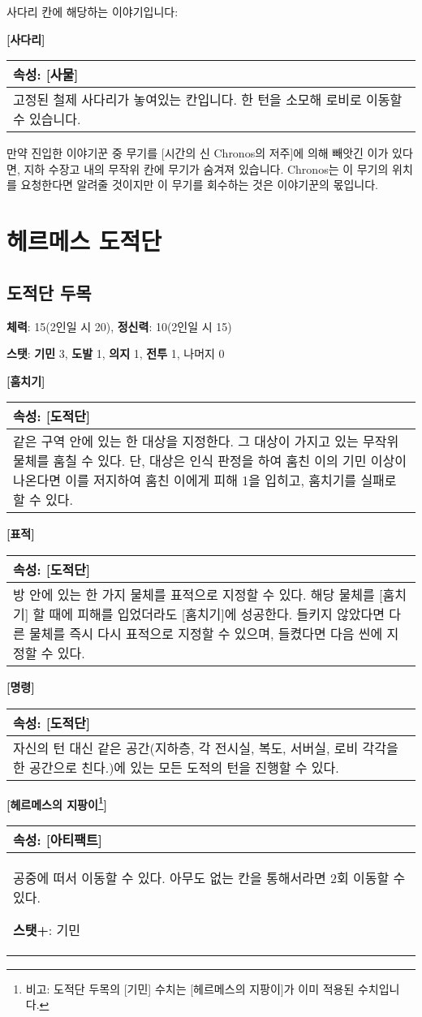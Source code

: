\documentclass[12pt]{report}
\newenvironment{story}[2]
{\begin{center}
		{\large \textbf{[#1]}}\\[1ex]
		\begin{tabular}{|p{\textwidth}|}
			\hline
			\textbf{속성}: #2
			\\
			\hline
		}
		{
			\\\hline
		\end{tabular}
	\end{center}
}
\begin{document}
	\bigskip
	
	사다리 칸에 해당하는 이야기입니다:
	\begin{story}{사다리}{[사물]}
		고정된 철제 사다리가 놓여있는 칸입니다. 한 턴을 소모해 로비로 이동할 수 있습니다.
	\end{story}
	
	만약 진입한 이야기꾼 중 무기를 [시간의 신 Chronos의 저주]에 의해 빼앗긴 이가 있다면, 지하 수장고 내의 무작위 칸에 무기가 숨겨져 있습니다. Chronos는 이 무기의 위치를 요청한다면 알려줄 것이지만 이 무기를 회수하는 것은 이야기꾼의 몫입니다.
	
	\chapter{헤르메스 도적단}
		\section*{도적단 두목}
		\textbf{체력}: 15(2인일 시 20), \textbf{정신력}: 10(2인일 시 15)
		
		\textbf{스탯}: \textbf{기민} 3, \textbf{도발} 1, \textbf{의지} 1, \textbf{전투} 1, 나머지 0
		
		\begin{story}{훔치기}{[도적단]}
			같은 구역 안에 있는 한 대상을 지정한다. 그 대상이 가지고 있는 무작위 물체를 훔칠 수 있다. 단, 대상은 인식 판정을 하여 훔친 이의 기민 이상이 나온다면 이를 저지하여 훔친 이에게 피해 1을 입히고, 훔치기를 실패로 할 수 있다.
		\end{story}

		\begin{story}{표적}{[도적단]}
			방 안에 있는 한 가지 물체를 표적으로 지정할 수 있다. 해당 물체를 [훔치기] 할 때에 피해를 입었더라도 [훔치기]에 성공한다. 들키지 않았다면 다른 물체를 즉시 다시 표적으로 지정할 수 있으며, 들켰다면 다음 씬에 지정할 수 있다.
		\end{story}
	
		\begin{story}{명령}{[도적단]}
			자신의 턴 대신 같은 공간(지하층, 각 전시실, 복도, 서버실, 로비 각각을 한 공간으로 친다.)에 있는 모든 도적의 턴을 진행할 수 있다.
		\end{story}
		
		\begin{story}{헤르메스의 지팡이\footnote{비고: 도적단 두목의 [기민] 수치는 [헤르메스의 지팡이]가 이미 적용된 수치입니다.}}{[아티팩트]}
			공중에 떠서 이동할 수 있다. 아무도 없는 칸을 통해서라면 2회 이동할 수 있다.
			
			\textbf{스탯+}: 기민
		\end{story}
		
\end{document}

